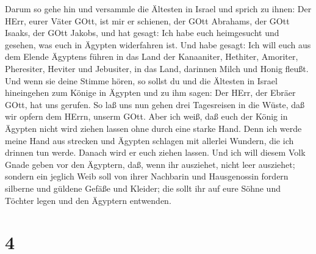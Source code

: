 Darum so gehe hin und versammle die Ältesten in Israel und sprich zu
ihnen: Der HErr, eurer Väter GOtt, ist mir er schienen, der GOtt
Abrahams, der GOtt Isaaks, der GOtt Jakobs, und hat gesagt: Ich habe
euch heimgesucht und gesehen, was euch in Ägypten widerfahren ist.
 Und habe gesagt: Ich will euch aus dem Elende Ägyptens
führen in das Land der Kanaaniter, Hethiter, Amoriter, Pheresiter,
Heviter und Jebusiter, in das Land, darinnen Milch und Honig fleußt.
 Und wenn sie deine Stimme hören, so sollst du und die
Ältesten in Israel hineingehen zum Könige in Ägypten und zu ihm sagen:
Der HErr, der Ebräer GOtt, hat uns gerufen. So laß uns nun gehen drei
Tagesreisen in die Wüste, daß wir opfern dem HErrn, unserm GOtt.
 Aber ich weiß, daß euch der König in Ägypten nicht wird
ziehen lassen ohne durch eine starke Hand.  Denn ich werde
meine Hand aus strecken und Ägypten schlagen mit allerlei Wundern, die
ich drinnen tun werde. Danach wird er euch ziehen lassen. 
Und ich will diesem Volk Gnade geben vor den Ägyptern, daß, wenn ihr
ausziehet, nicht leer ausziehet;  sondern ein jeglich Weib
soll von ihrer Nachbarin und Hausgenossin fordern silberne und güldene
Gefäße und Kleider; die sollt ihr auf eure Söhne und Töchter legen und
den Ägyptern entwenden.

\hypertarget{section-3}{%
\section{4}\label{section-3}}

